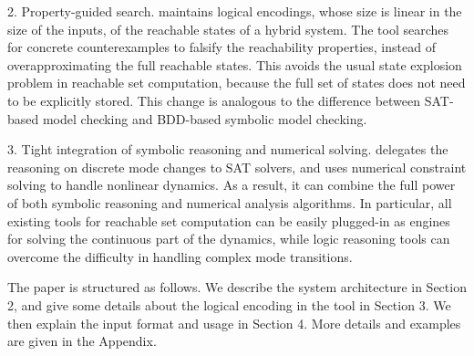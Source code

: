 2. Property-guided search. \dReach{} maintains logical encodings, whose size is linear in the size of the inputs, of the reachable states of
a hybrid system. The tool searches for concrete counterexamples to falsify the reachability properties, instead of overapproximating the full reachable states.
This avoids the usual state explosion problem in reachable set computation, because the full set of states does not need to be explicitly stored. This change
is analogous to the difference between SAT-based model checking and BDD-based symbolic model checking.

3. Tight integration of symbolic reasoning and numerical solving. \dReach{} delegates the
reasoning on discrete mode changes to SAT solvers, and uses numerical constraint solving to handle nonlinear dynamics.
As a result, it can combine the full power of both symbolic reasoning and numerical analysis algorithms. In particular,
all existing tools for reachable set computation can be easily plugged-in as engines for solving
the continuous part of the dynamics, while logic reasoning tools can overcome the difficulty
in handling complex mode transitions.

The paper is structured as follows. We describe the system architecture in Section 2,
and give some details about the logical encoding in the tool in Section 3.
We then explain the input format and usage in Section 4. More details and examples are given in the Appendix.



